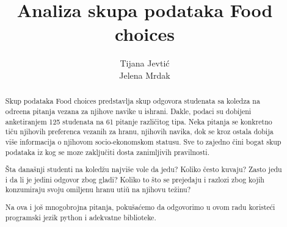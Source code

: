 \documentclass[12pt,a4paper]{article}
\title{Analiza skupa podataka Food choices}
\author{Tijana Jevti\' c \\ Jelena Mrdak}
\begin{document}
\maketitle

\newpage

\begin{abstract}
Skup podataka Food choices predstavlja skup odgovora studenata sa koledza na odre\dj ena pitanja vezana za njihove navike u ishrani. Dakle, podaci su dobijeni anketiranjem 125 studenata na 61 pitanje razli\v citog tipa. Neka pitanja se konkretno ti\v cu njihovih preferenca vezanih za hranu, njihovih navika, dok se kroz ostala dobija vi\v se informacija o njihovom socio-ekonomskom statusu. Sve to zajedno \v cini bogat skup podataka iz kog se moze zaklju\v citi dosta zanimljivih pravilnosti.

\v Sta dana\v snji studenti na koled\v zu najvi\v se vole da jedu? Koliko \v cesto kuvaju? Zasto jedu i da li je jedini odgovor zbog gladi? Koliko to \v sto se prejedaju i razlozi zbog kojih konzumiraju svoju omiljenu hranu uti\v u na njihovu te\v zinu?

Na ova i jo\v s mnogobrojna pitanja, poku\v sa\' cemo da odgovorimo u ovom radu koriste\' ci programski jezik python i adekvatne biblioteke.
\end{abstract}

\newpage

\tableofcontents

\newpage
\end{document}
